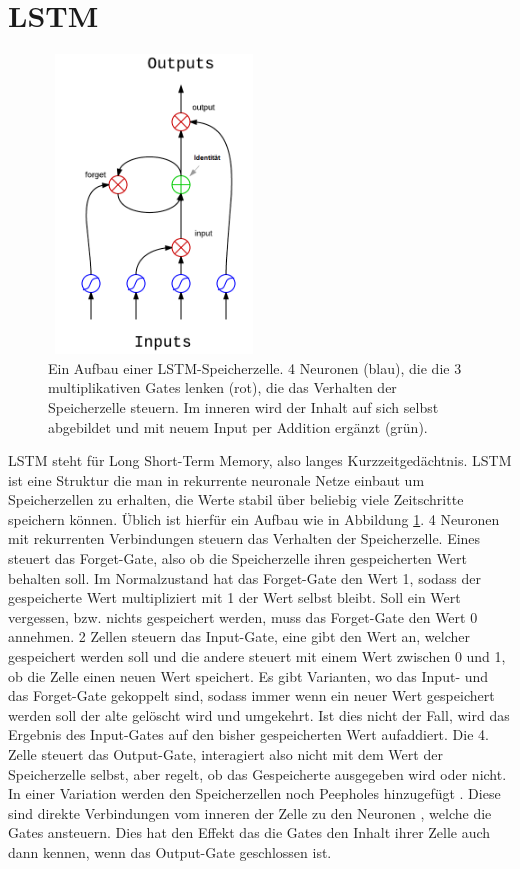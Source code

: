 \section{LSTM}
\begin{figure}
	\centering
	\includegraphics[width=0.5\textwidth, height=300px]{pics/lstm.png}	
	\caption{Ein Aufbau einer LSTM-Speicherzelle. 4 Neuronen (blau), die die 3 multiplikativen Gates lenken (rot), die das Verhalten der Speicherzelle steuern. Im inneren wird der Inhalt auf sich selbst abgebildet und mit neuem Input per Addition ergänzt (grün).    \cite{bib:lstmpic}}
	\label{img:lstm}
\end{figure}
LSTM steht für Long Short-Term Memory, also langes Kurzzeitgedächtnis. LSTM ist eine Struktur die man in rekurrente neuronale Netze einbaut um Speicherzellen zu erhalten, die Werte stabil über beliebig viele Zeitschritte speichern können. Üblich ist hierfür ein Aufbau wie in Abbildung \ref{img:lstm}. 4 Neuronen mit rekurrenten Verbindungen steuern das Verhalten der Speicherzelle. Eines steuert das Forget-Gate, also ob die Speicherzelle ihren gespeicherten Wert behalten soll. Im Normalzustand hat das Forget-Gate den Wert 1, sodass der gespeicherte Wert multipliziert mit 1 der Wert selbst bleibt. Soll ein Wert vergessen, bzw. nichts gespeichert werden, muss das Forget-Gate den Wert 0 annehmen. 2 Zellen steuern das Input-Gate, eine gibt den Wert an, welcher gespeichert werden soll und die andere steuert mit einem Wert zwischen 0 und 1, ob die Zelle einen neuen Wert speichert. Es gibt Varianten, wo das Input- und das Forget-Gate gekoppelt sind, sodass immer wenn ein neuer Wert gespeichert werden soll der alte gelöscht wird und umgekehrt\cite{bib:lstm3}. Ist dies nicht der Fall, wird das Ergebnis des Input-Gates auf den bisher gespeicherten Wert aufaddiert. Die 4. Zelle steuert das Output-Gate, interagiert also nicht mit dem Wert der Speicherzelle selbst, aber regelt, ob das Gespeicherte ausgegeben wird oder nicht. \cite{bib:lstm}
In einer Variation werden den Speicherzellen noch Peepholes hinzugefügt \cite{bib:peep}. Diese sind direkte Verbindungen vom inneren der Zelle zu den Neuronen , welche die Gates ansteuern. Dies hat den Effekt das die Gates den Inhalt ihrer Zelle auch dann kennen, wenn das Output-Gate geschlossen ist.  

